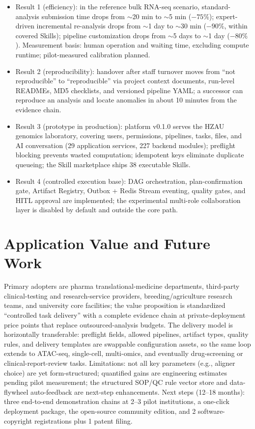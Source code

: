 \documentclass[11pt,a4paper]{article}
\begin{document}
\begin{itemize}
  \item Result 1 (efficiency): in the reference bulk RNA-seq scenario, standard-analysis submission time drops from $\sim$20 min to $\sim$5 min ($-75\%$); expert-driven incremental re-analysis drops from $\sim$1 day to $\sim$30 min ($-90\%$, within covered Skills); pipeline customization drops from $\sim$5 days to $\sim$1 day ($-80\%$). Measurement basis: human operation and waiting time, excluding compute runtime; pilot-measured calibration planned.
  \item Result 2 (reproducibility): handover after staff turnover moves from ``not reproducible'' to ``reproducible'' via project context documents, run-level READMEs, MD5 checklists, and versioned pipeline YAML; a successor can reproduce an analysis and locate anomalies in about 10 minutes from the evidence chain.
  \item Result 3 (prototype in production): platform v0.1.0 serves the HZAU genomics laboratory, covering users, permissions, pipelines, tasks, files, and AI conversation (29 application services, 227 backend modules); preflight blocking prevents wasted computation; idempotent keys eliminate duplicate queueing; the Skill marketplace ships 38 executable Skills.
  \item Result 4 (controlled execution base): DAG orchestration, plan-confirmation gate, Artifact Registry, Outbox + Redis Stream eventing, quality gates, and HITL approval are implemented; the experimental multi-role collaboration layer is disabled by default and outside the core path.
\end{itemize}

\section{Application Value and Future Work}

Primary adopters are pharma translational-medicine departments, third-party clinical-testing and research-service providers, breeding/agriculture research teams, and university core facilities; the value proposition is standardized ``controlled task delivery'' with a complete evidence chain at private-deployment price points that replace outsourced-analysis budgets. The delivery model is horizontally transferable: preflight fields, allowed pipelines, artifact types, quality rules, and delivery templates are swappable configuration assets, so the same loop extends to ATAC-seq, single-cell, multi-omics, and eventually drug-screening or clinical-report-review tasks. Limitations: not all key parameters (e.g., aligner choice) are yet form-structured; quantified gains are engineering estimates pending pilot measurement; the structured SOP/QC rule vector store and data-flywheel auto-feedback are next-step enhancements. Next steps (12--18 months): three end-to-end demonstration chains at 2--3 pilot institutions, a one-click deployment package, the open-source community edition, and 2 software-copyright registrations plus 1 patent filing.
\end{document}
